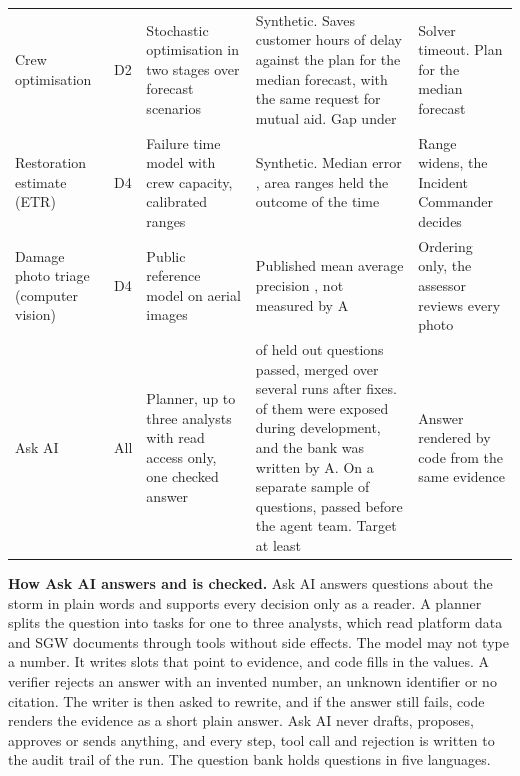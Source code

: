 \documentclass[fontsize=10pt,a4paper,DIV=12,parskip=half-,numbers=noenddot,headsepline,captions=tableheading]{scrartcl}
\begin{document}
{\begin{xltabular}{\textwidth}{@{}L{2.2cm} L{1.1cm} L{3.6cm} Y L{3.0cm}@{}}
  Crew optimisation & D2 & Stochastic optimisation in two stages over forecast scenarios & Synthetic. Saves  customer hours of delay against the plan for the median forecast, with the same request for mutual aid. Gap under  & Solver timeout. Plan for the median forecast \\ \lightrowrule
  Restoration estimate (ETR) & D4 & Failure time model with crew capacity, calibrated ranges & Synthetic. Median error , area ranges held the outcome  of the time & Range widens, the Incident Commander decides \\ \lightrowrule
  Damage photo triage (computer vision) & D4 & Public reference model on aerial images & Published mean average precision , not measured by A & Ordering only, the assessor reviews every photo \\ \lightrowrule
  Ask AI & All & Planner, up to three analysts with read access only, one checked answer &  of  held out questions passed, merged over several runs after fixes.  of them were exposed during development, and the bank was written by A. On a separate sample of  questions,  passed before the agent team. Target at least  & Answer rendered by code from the same evidence \\
\end{xltabular}}

\textbf{How Ask AI answers and is checked.} Ask AI answers questions about the storm in plain words and supports every decision only as a reader. A planner splits the question into tasks for one to three analysts, which read platform data and SGW documents through tools without side effects. The model may not type a number. It writes slots that point to evidence, and code fills in the values. A verifier rejects an answer with an invented number, an unknown identifier or no citation. The writer is then asked to rewrite, and if the answer still fails, code renders the evidence as a short plain answer. Ask AI never drafts, proposes, approves or sends anything, and every step, tool call and rejection is written to the audit trail of the run. The question bank holds  questions in five languages.
\end{document}
